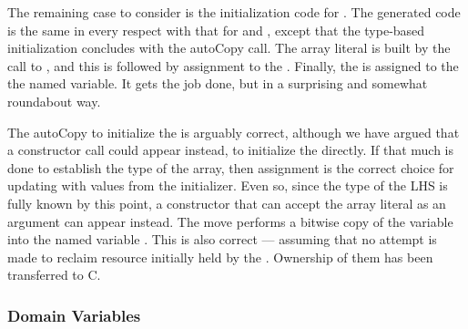 The remaining case to consider is the initialization code for .  The generated
code is the same in every respect with that for  and , except that the
type-based initialization concludes with the autoCopy call.  The array literal is built by
the call to , and this is followed by assignment to the
.  Finally, the  is assigned to the the named variable.  It
gets the job done, but in a surprising and somewhat roundabout way.

The autoCopy to initialize the  is arguably correct, although we have
argued that a constructor call could appear instead, to initialize the  directly.
If that much is done to establish the type of the array, then assignment is the correct
choice for updating with values from the initializer.  Even so, since the type of the LHS
is fully known by this point, a constructor that can accept the array literal as an
argument can appear instead.  The move performs a bitwise copy of the 
variable into the named variable .  This is also correct --- assuming that no
attempt is made to reclaim resource initially held by the .  Ownership of
them has been transferred to C.

\subsubsection{Domain Variables}

